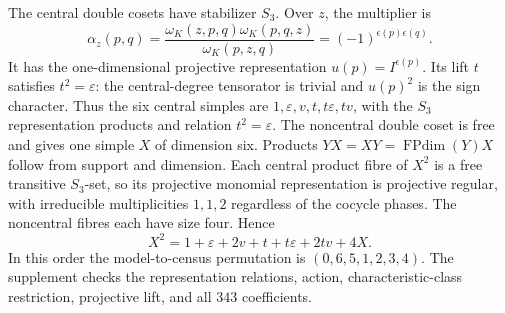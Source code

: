 \documentclass[11pt]{article}
\newcommand{\FPdim}{\operatorname{FPdim}}
\begin{document}
The central double cosets have stabilizer $S_3$. Over $z$, the multiplier is
\[
 \alpha_z(p,q)=\frac{\omega_K(z,p,q)\omega_K(p,q,z)}{\omega_K(p,z,q)}
              =(-1)^{\epsilon(p)\epsilon(q)}.
\]
It has the one-dimensional projective representation
$u(p)=I^{\epsilon(p)}$. Its lift $t$ satisfies $t^2=\varepsilon$:
the central-degree tensorator is trivial and $u(p)^2$ is the sign
character. Thus the six central simples are
$1,\varepsilon,v,t,t\varepsilon,tv$, with the $S_3$ representation
products and relation $t^2=\varepsilon$.
The noncentral double coset is free and gives one simple $X$ of
dimension six. Products $YX=XY=\FPdim(Y)X$ follow from support and
dimension. Each central product fibre of $X^2$ is a free transitive
$S_3$-set, so its projective monomial representation is projective
regular, with irreducible multiplicities $1,1,2$ regardless of the
cocycle phases. The noncentral fibres each have size four. Hence
\[
 X^2=1+\varepsilon+2v+t+t\varepsilon+2tv+4X.
\]
In this order the model-to-census permutation is $(0,6,5,1,2,3,4)$.
The supplement checks the representation relations, action,
characteristic-class restriction, projective lift, and all $343$
coefficients.





\end{document}
